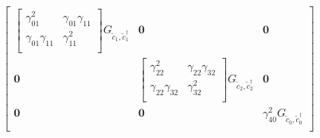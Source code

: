 \[
\begin{bmatrix}
    \begin{bmatrix}
        \gamma_{01}^2           & \gamma_{01}\gamma_{11}                \\
        \gamma_{01}\gamma_{11}  & \gamma_{11}^2                         \\
    \end{bmatrix} G_{\tilde{c}_1, \tilde{c}^\dagger_1}   &   \mathbf{0}  &   \mathbf{0}            \\
    \mathbf{0}      & \begin{bmatrix}
                        \gamma_{22}^2           & \gamma_{22}\gamma_{32}\\
                        \gamma_{22}\gamma_{32}  & \gamma_{32}^2         \\
                      \end{bmatrix} G_{\tilde{c}_2, \tilde{c}^\dagger_2}  &   \mathbf{0}          \\
    \mathbf{0}      &   \mathbf{0}  &   \gamma_{40}^2           G_{\tilde{c}_0, \tilde{c}^\dagger_0}       \\
\end{bmatrix}
\]




